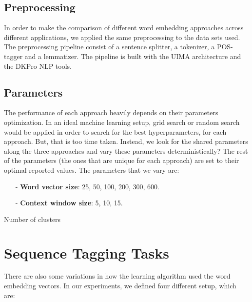 \documentclass[11pt]{article}
\begin{document}
\subsection{Preprocessing}

In order to make the comparison of different word embedding approaches across different applications, we applied the same preprocessing to the data sets used. 
The preprocessing pipeline consist of a sentence splitter, a tokenizer, a POS-tagger and a lemmatizer. The pipeline is built with the UIMA architecture and the DKPro NLP tools. 


\subsection{Parameters}

The performance of each approach heavily depends on their parameters optimization.
In an ideal machine learning setup, grid search or random search would be applied in order to search for the best hyperparameters, for each approach.
But, that is too time taken. Instead, we look for the shared parameters along the three approaches and vary these parameters deterministically? 
The rest of the parameters (the ones that are unique for each approach) are set to  their optimal reported values.
The parameters that we vary are:



\begin{itemize}
\item[-]\textbf{Word vector size}: 25, 50, 100, 200, 300, 600.
\item[-]\textbf{Context window size}: 5, 10, 15.
\end{itemize}

Number of clusters


\section{Sequence Tagging Tasks}

There are also some variations in how the learning algorithm used
the word embedding vectors. In our experiments, we defined four different
setup, which are:
\end{document}
